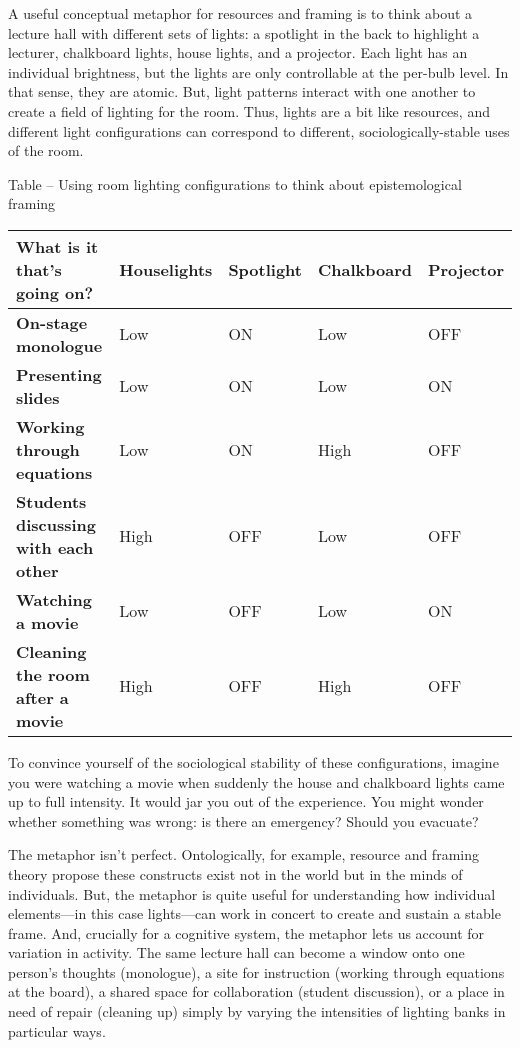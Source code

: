A useful conceptual metaphor for resources and framing is to think about
a lecture hall with different sets of lights: a spotlight in the back to
highlight a lecturer, chalkboard lights, house lights, and a projector.
Each light has an individual brightness, but the lights are only
controllable at the per-bulb level. In that sense, they are atomic. But,
light patterns interact with one another to create a field of lighting
for the room. Thus, lights are a bit like resources, and different light
configurations can correspond to different, sociologically-stable uses
of the room.

\protect\hypertarget{ux5fToc252445958}{}{}Table -- Using room lighting
configurations to think about epistemological framing

\begin{longtable}[]{@{}lllll@{}}
\toprule
\textbf{What is it that's going on?} & Houselights & Spotlight &
Chalkboard & Projector\tabularnewline
\midrule
\endhead
\textbf{On-stage monologue} & Low & ON & Low & OFF\tabularnewline
\textbf{Presenting slides} & Low & ON & Low & ON\tabularnewline
\textbf{Working through equations} & Low & ON & High &
OFF\tabularnewline
\textbf{Students discussing with each other} & High & OFF & Low &
OFF\tabularnewline
\textbf{Watching a movie} & Low & OFF & Low & ON\tabularnewline
\textbf{Cleaning the room after a movie} & High & OFF & High &
OFF\tabularnewline
\bottomrule
\end{longtable}

To convince yourself of the sociological stability of these
configurations, imagine you were watching a movie when suddenly the
house and chalkboard lights came up to full intensity. It would jar you
out of the experience. You might wonder whether something was wrong: is
there an emergency? Should you evacuate?

The metaphor isn't perfect. Ontologically, for example, resource and
framing theory propose these constructs exist not in the world but in
the minds of individuals. But, the metaphor is quite useful for
understanding how individual elements---in this case lights---can work
in concert to create and sustain a stable frame. And, crucially for a
cognitive system, the metaphor lets us account for variation in
activity. The same lecture hall can become a window onto one person's
thoughts (monologue), a site for instruction (working through equations
at the board), a shared space for collaboration (student discussion), or
a place in need of repair (cleaning up) simply by varying the
intensities of lighting banks in particular ways.

